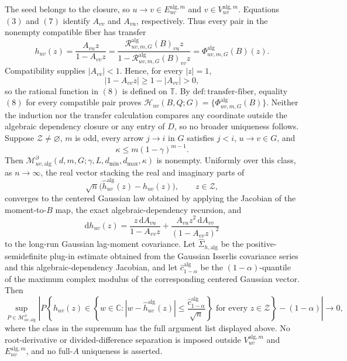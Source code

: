 The seed belongs to the closure, so \(u\to v\in E_{uv}^{\mathrm{alg},m}\) and \(v\in V_{uv}^{\mathrm{alg},m}\).  Equations \((3)\) and \((7)\) identify \(A_{vv}\) and \(A_{vu}\), respectively.  Thus every pair in the nonempty compatible fiber has transfer
\[
 h_{uv}(z)
 =\frac{A_{vu}z}{1-A_{vv}z}
 =\frac{\mathscr R^{\mathrm{alg}}_{uv,m,G}(B)_{vu}z}
 {1-\mathscr R^{\mathrm{alg}}_{uv,m,G}(B)_{vv}z}
 =\Phi^{\mathrm{alg}}_{uv,m,G}(B)(z).
\tag{8}
\]
Compatibility supplies \(|A_{vv}|<1\).  Hence, for every \(|z|=1\),
\[
 |1-A_{vv}z|\ge1-|A_{vv}|>0,
\tag{9}
\]
so the rational function in \((8)\) is defined on \(\mathbb T\).  By \(\mathrm{def{:}transfer\mbox{-}fiber}\), equality \((8)\) for every compatible pair proves
\(\mathcal H_{uv}(B,Q;G)=\{\Phi^{\mathrm{alg}}_{uv,m,G}(B)\}\).  Neither the induction nor the transfer calculation compares any coordinate outside the algebraic dependency closure or any entry of \(D\), so no broader uniqueness follows.
Suppose \(\mathcal Z\ne\varnothing\), \(m\) is odd, every arrow \(j\to i\) in \(G\) satisfies \(j<i\), \(u\to v\in G\), and
\[
 \kappa\le m(1-\gamma)^{m-1}.
\]
Then \(\mathcal M_{uv,\mathrm{alg}}^{\partial}(d,m,G;\gamma,L,d_{\min},d_{\max},\kappa)\) is nonempty.  Uniformly over this class, as \(n\to\infty\), the real vector stacking the real and imaginary parts of
\[
 \sqrt n\bigl(\widehat h_{uv}^{\mathrm{alg}}(z)-h_{uv}(z)\bigr),
 \qquad z\in\mathcal Z,
\]
converges to the centered Gaussian law obtained by applying the Jacobian of the moment-to-\(B\) map, the exact algebraic-dependency recursion, and
\[
 \mathrm dh_{uv}(z)
 =\frac{z\,\mathrm dA_{vu}}{1-A_{vv}z}
  +\frac{A_{vu}z^2\,\mathrm dA_{vv}}{(1-A_{vv}z)^2}
\]
to the long-run Gaussian lag-moment covariance.  Let \(\widehat\Sigma_{h,\mathrm{alg}}\) be the positive-semidefinite plug-in estimate obtained from the Gaussian Isserlis covariance series and this algebraic-dependency Jacobian, and let \(\widehat c_{1-\alpha}^{\mathrm{alg}}\) be the \((1-\alpha)\)-quantile of the maximum complex modulus of the corresponding centered Gaussian vector.  Then
\[
 \sup_{P\in\mathcal M_{uv,\mathrm{alg}}^{\partial}}
 \left|
 P\!\left\{
 h_{uv}(z)\in
 \left\{w\in\mathbb C:
 |w-\widehat h_{uv}^{\mathrm{alg}}(z)|
 \le\frac{\widehat c_{1-\alpha}^{\mathrm{alg}}}{\sqrt n}
 \right\}
 \text{ for every }z\in\mathcal Z
 \right\}-(1-\alpha)
 \right|\longrightarrow0,
\]
where the class in the supremum has the full argument list displayed above.  No root-derivative or divided-difference separation is imposed outside \(V_{uv}^{\mathrm{alg},m}\) and \(E_{uv}^{\mathrm{alg},m}\), and no full-\(A\) uniqueness is asserted.
